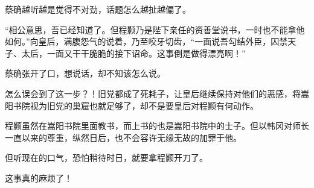 蔡确越听越是觉得不对劲，话题怎么越扯越偏了。

“相公意思，吾已经知道了。但程颢乃是陛下亲任的资善堂说书，一时也不能拿他如何。”向皇后，满腹怨气的说着，乃至咬牙切齿，“一面说吾勾结外臣，囚禁天子、太后，一面又干干脆脆的接下诏命。这事倒是做得漂亮啊！”

蔡确张开了口，想说话，却不知该怎么说。

怎么误会到了这一步？！旧党都成了死耗子，让皇后继续保持对他们的恶感，将嵩阳书院视为旧党的巢窟也就足够了，却不是要皇后对程颢有何动作。

程颢虽然在嵩阳书院里面教书，而上书的也是嵩阳书院中的士子。但以韩冈对师长一直以来的尊重，纵然日后，也不会容许无缘无故的加罪于他。

但听现在的口气，恐怕稍待时日，就要拿程颢开刀了。

这事真的麻烦了！

